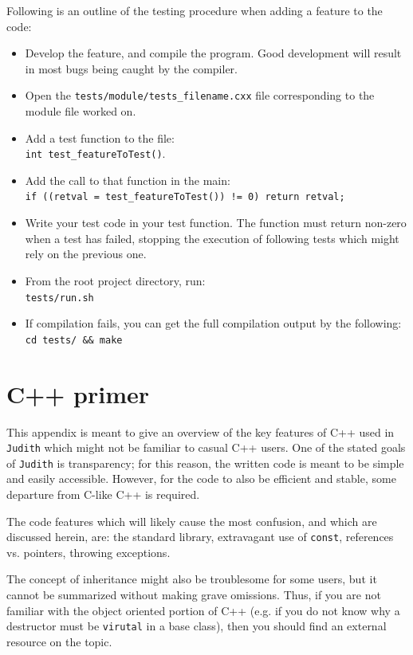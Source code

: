 \documentclass[10pt,a4paper]{book}
\newcommand{\Judith}{\Verb`Judith` }
\begin{document}
Following is an outline of the testing procedure when adding a feature to the code:

\begin{itemize}
	\item Develop the feature, and compile the program. Good development will result in most bugs being caught by the compiler.
	\item Open the \Verb`tests/module/tests_filename.cxx` file corresponding to the module file worked on.
	\item Add a test function to the file:\\
		  \Verb`int test_featureToTest()`.
	\item Add the call to that function in the main:\\
		  \Verb`if ((retval = test_featureToTest()) != 0) return retval;`
	\item Write your test code in your test function. The function must return non-zero when a test has failed, stopping the execution of following tests which might rely on the previous one.
	\item From the root project directory, run:\\
		  \Verb`tests/run.sh`
	\item If compilation fails, you can get the full compilation output by the following:
		  \Verb`cd tests/ && make`
\end{itemize}

\appendix

\chapter{C++ primer}
\label{ch:cppprimer}

This appendix is meant to give an overview of the key features of C++ used in \Judith which might not be familiar to casual C++ users. One of the stated goals of \Judith is transparency; for this reason, the written code is meant to be simple and easily accessible. However, for the code to also be efficient and stable, some departure from C-like C++ is required.

The code features which will likely cause the most confusion, and which are discussed herein, are: the standard library, extravagant use of \Verb`const`, references vs. pointers, throwing exceptions.

The concept of inheritance might also be troublesome for some users, but it cannot be summarized without making grave omissions. Thus, if you are not familiar with the object oriented portion of C++ (e.g. if you do not know why a destructor must be \Verb`virutal` in a base class), then you should find an external resource on the topic.
\end{document}
